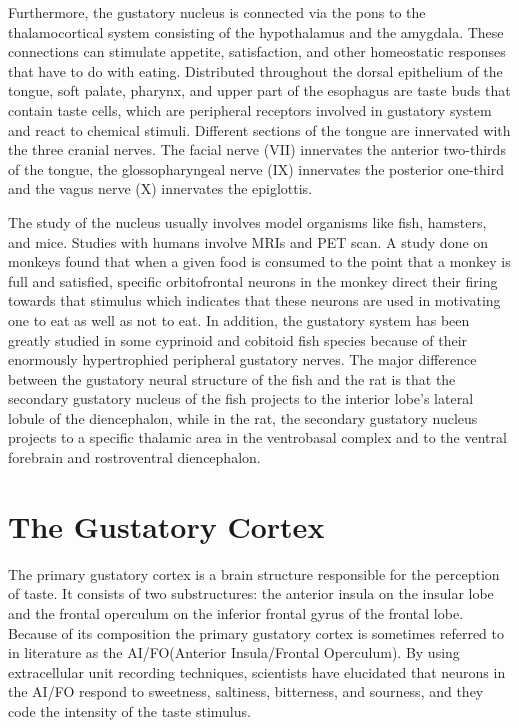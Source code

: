 Furthermore, the gustatory nucleus is connected via the pons to the thalamocortical system consisting of the hypothalamus and the amygdala. These connections can stimulate appetite, satisfaction, and other homeostatic responses that have to do with eating. Distributed throughout the dorsal epithelium of the tongue, soft palate, pharynx, and upper part of the esophagus are taste buds that contain taste cells, which are peripheral receptors involved in gustatory system and react to chemical stimuli. Different sections of the tongue are innervated with the three cranial nerves. The facial nerve (VII) innervates the anterior two-thirds of the tongue, the glossopharyngeal nerve (IX) innervates the posterior one-third and the vagus nerve (X) innervates the epiglottis.

The study of the nucleus usually involves model organisms like fish, hamsters, and mice. Studies with humans involve MRIs and PET scan. A study done on monkeys found that when a given food is consumed to the point that a monkey is full and satisfied, specific orbitofrontal neurons in the monkey direct their firing towards that stimulus which indicates that these neurons are used in motivating one to eat as well as not to eat. In addition, the gustatory system has been greatly studied in some cyprinoid and cobitoid fish species because of their enormously hypertrophied peripheral gustatory nerves. The major difference between the gustatory neural structure of the fish and the rat is that the secondary gustatory nucleus of the fish projects to the interior lobe's lateral lobule of the diencephalon, while in the rat, the secondary gustatory nucleus projects to a specific thalamic area in the ventrobasal complex and to the ventral forebrain and rostroventral diencephalon.

\hypertarget{the-gustatory-cortex}{%
\section{The Gustatory Cortex}\label{the-gustatory-cortex}}

The primary gustatory cortex is a brain structure responsible for the perception of taste. It consists of two substructures: the anterior insula on the insular lobe and the frontal operculum on the inferior frontal gyrus of the frontal lobe. Because of its composition the primary gustatory cortex is sometimes referred to in literature as the AI/FO(Anterior Insula/Frontal Operculum). By using extracellular unit recording techniques, scientists have elucidated that neurons in the AI/FO respond to sweetness, saltiness, bitterness, and sourness, and they code the intensity of the taste stimulus.


